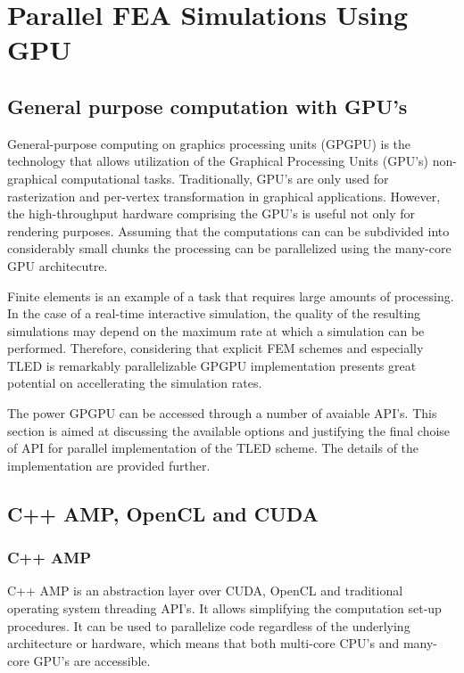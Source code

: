 \section{Parallel FEA Simulations Using GPU }\label{work-overview}

\subsection{General purpose computation with GPU's}

  General-purpose computing on graphics processing units (GPGPU) is the technology that allows utilization of the Graphical Processing Units (GPU's) non-graphical computational tasks. Traditionally, GPU's are only used for rasterization and per-vertex transformation in graphical applications. However, the high-throughput hardware comprising the GPU's is useful not only for rendering purposes. Assuming that the computations can can be subdivided into considerably small chunks the processing can be parallelized using the many-core GPU architecutre.

  Finite elements is an example of a task that requires large amounts of processing. In the case of a real-time interactive simulation, the quality of the resulting simulations may depend on the maximum rate at which a simulation can be performed. Therefore, considering that explicit FEM schemes and especially TLED is remarkably parallelizable GPGPU implementation presents great potential on accellerating the simulation rates.

  The power GPGPU can be accessed through a number of avaiable API's. This section is aimed at discussing the available options and justifying the final choise of API for parallel implementation of the TLED scheme. The details of the implementation are provided further.

\subsection{C++ AMP, OpenCL and CUDA}

  \subsubsection{C++ AMP}

  C++ AMP is an abstraction layer over CUDA, OpenCL and traditional operating system threading API's. It allows simplifying the computation set-up procedures. It can be used to parallelize code regardless of the underlying architecture or hardware, which means that both multi-core CPU's and many-core GPU's are accessible.

